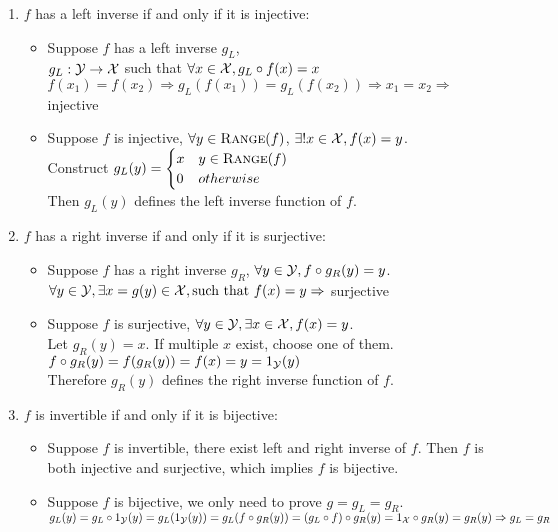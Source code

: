 \problem
\begin{enumerate}
\item $f$ has a left inverse if and only if it is injective:
\begin{itemize}
	\item Suppose $f$ has a left inverse $g_L$, \\
	$g_L:\mathcal{Y} \rightarrow \mathcal{X}$ such that $\forall x\in \mathcal{X}, g_L \circ f(x) = x$ \\
	$f(x_1)=f(x_2) \Rightarrow g_L(f(x_1)) = g_L(f(x_2)) \Rightarrow x_1 = x_2 \Rightarrow$ injective
	\item Suppose $f$ is injective, $\forall y \in {\mbox{\sc{Range}}}(f)$, $\exists ! x \in \mathcal{X}, f(x) = y$. \\
	Construct $g_L(y) = \begin{cases}
	x & y \in {\mbox{\sc{Range}}}(f) \\
	0 & otherwise
	\end{cases}$ \\
	Then $g_L(y)$ defines the left inverse function of $f$.
\end{itemize}

\item $f$ has a right inverse if and only if it is surjective:
\begin{itemize}
	\item Suppose $f$ has a right inverse $g_R$, $\forall y \in \mathcal{Y}, f \circ g_R(y) = y$. \\
	$\forall y \in \mathcal{Y}, \exists x = g(y) \in \mathcal{X}, \text{such that } f(x) = y \Rightarrow$ surjective
	\item Suppose $f$ is surjective, $\forall y \in \mathcal{Y}, \exists x \in \mathcal{X}, f(x) = y$. \\
	Let $g_R(y) = x$. If multiple $x$ exist, choose one of them. \\
	$f \circ g_R (y) = f(g_R(y)) = f(x) = y = 1_{\mathcal{Y}}(y)$ \\
	Therefore $g_R(y)$ defines the right inverse function of $f$.
\end{itemize}

\item $f$ is invertible if and only if it is bijective:
\begin{itemize}
	\item Suppose $f$ is invertible, there exist left and right inverse of $f$. Then $f$ is both injective and surjective, which implies $f$ is bijective.
	\item Suppose $f$ is bijective, we only need to prove $g = g_L = g_R$. \\
	$g_L(y) = g_L \circ 1_{\mathcal{Y}}(y) = g_L(1_{\mathcal{Y}}(y)) = g_L(f\circ g_R(y)) = (g_L \circ f) \circ g_R (y) = 1_{\mathcal{X}} \circ g_R (y) = g_R(y) \Rightarrow g_L = g_R$
\end{itemize}
\end{enumerate} \QED
